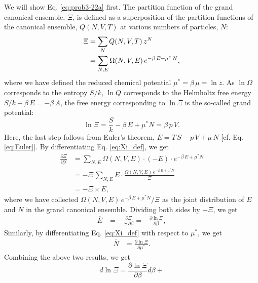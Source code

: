 \documentclass[twocolumn, 10pt]{article}
\numberwithin{equation}{section}
\newenvironment{solution}[1][\empty]
{\par\medskip
  \textbf{\ifx\empty#1{Solution.}\relax\else{#1}\fi} \ignorespaces}
{\medskip}
\begin{document}
\begin{solution}
We will show Eq. \eqref{eq:prob3-22a} first.
The partition function of the grand canonical ensemble, $\Xi$,
is defined as a superposition of
the partition functions of the canonical ensemble, $Q(N, V, T)$
at various numbers of particles, $N$:
%
\begin{align}
\Xi
  &=
  \sum_{N} Q(N, V, T) \, z^N
  \notag \\
  &=
  \sum_{N, E} \Omega(N, V, E) \, e^{-\beta \, E + \mu^* \, N}
,
  \label{eq:Xi_def}
\end{align}
%
where we have defined the reduced chemical potential $\mu^* = \beta \, \mu = \ln z$.
%
As $\ln \Omega$ corresponds to the entropy $S/k$,
$\ln Q$ corresponds to the Helmholtz free energy $S/k - \beta \, E = -\beta \, A$,
the free energy corresponding to $\ln \Xi$
is the so-called grand potential:
%
\begin{equation}
  \ln \Xi
  = \frac{S}{k} - \beta \, E + \mu^* N
  = \beta \, p \, V
  .
  \label{eq:lnXi}
\end{equation}
Here, the last step follows from Euler's theorem,
$E = T \, S - p \, V + \mu \, N$ [cf. Eq. \eqref{eq:Euler}].
%
By differentiating Eq. \eqref{eq:Xi_def}, we get
%
\begin{align*}
  \frac{ \partial \Xi } { \partial \beta }
  &=
  \sum_{N, E} \Omega(N, V, E) \cdot (-E) \cdot e^{-\beta \, E + \mu^* N}
  \\
  &=
  -\Xi \,
  \sum_{N, E} E \cdot \frac{ \Omega(N, V, E) \, e^{-\beta \, E + \mu^* N} } { \Xi }
  \\
  &=
  -\Xi \times \overline{E}
  ,
\end{align*}
%
where we have collected
$\Omega(N, V, E) \, e^{-\beta \, E + \mu^* N}/\Xi$
as the joint distribution of $E$ and $N$
in the grand canonical ensemble.
%
Dividing both sides by $-\Xi$,
we get
\begin{align}
  \overline E
  &=
  -\frac{ \partial \Xi } { \Xi \, \partial \beta }
  =
  -\frac{ \partial \ln \Xi } { \partial \beta }
  ,
  \label{eq:dXidbeta}
\end{align}
Similarly, by differentiating Eq. \eqref{eq:Xi_def}
with respect to $\mu^*$, we get
\begin{align}
  \overline N &= \frac{ \partial \ln \Xi } { \partial \mu^* }
  .
  \label{eq:dXidmu}
\end{align}
%
Combining the above two results, we get
\begin{equation}
  d \ln \Xi
  =
  \frac{ \partial \ln \Xi } { \partial \beta } d\beta
  +

\end{equation}
\end{solution}
\end{document}
